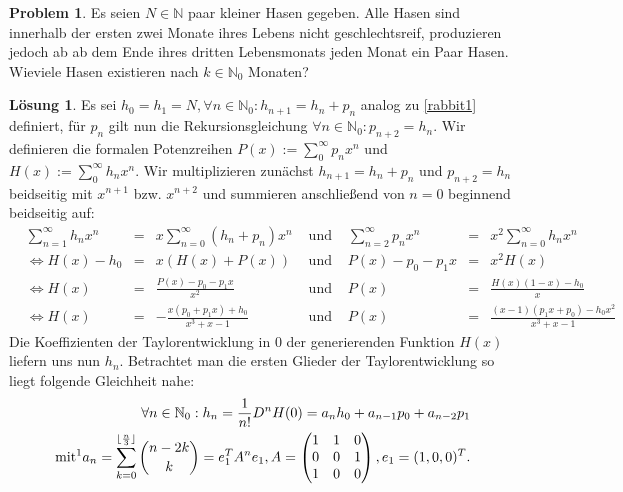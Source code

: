 \documentclass{article}
\theoremstyle{plain} %
\theoremstyle{definition} %
\newtheorem{problem}[theorem]{Problem}
\newtheorem{solution}[theorem]{Lösung}
\newcommand{\floor}[1]{\lfloor #1 \rfloor} %
\begin{document}
\begin{problem}
Es seien $N \in \mathbb{N}$ paar kleiner Hasen gegeben. Alle Hasen sind innerhalb der ersten zwei Monate ihres Lebens nicht geschlechtsreif, produzieren jedoch ab ab dem Ende ihres dritten Lebensmonats jeden Monat ein Paar Hasen. Wieviele Hasen existieren nach $k \in \mathbb{N}_0$ Monaten?
\end{problem}
\begin{solution}
  Es sei $h_0 = h_1 = N, \forall n \in \mathbb{N}_0 : h_{n+1} = h_n + p_n$ analog zu \ref{rabbit1} definiert, für $p_n$ gilt nun die Rekursionsgleichung $\forall n \in \mathbb{N}_0 : p_{n+2} = h_n$. Wir definieren die formalen Potenzreihen $P(x) := \sum_0^\infty p_n x^n$ und $H(x) := \sum_0^\infty h_n x^n$. Wir multiplizieren zunächst $h_{n+1} = h_n + p_n$ und $p_{n+2} = h_n$ beidseitig mit $x^{n+1}$ bzw. $x^{n+2}$ und summieren anschließend von $n=0$ beginnend beidseitig auf:
  \begin{align}
     & \sum_{n=1}^\infty h_n x^n & = & x \sum_{n=0}^\infty (h_n + p_n) x^n      & \text{ und } & \sum_{n=2}^\infty p_n x^n & = & x^2 \sum_{n=0}^\infty h_n x^n              \\
     & \iff H(x) - h_0           & = & x (H(x) + P(x))                          & \text{ und } & P(x) - p_0 - p_1x         & = & x^2 H(x)                                   \\
     & \iff H(x)                 & = & \frac{P(x) - p_0 - p_1x}{x^2}            & \text{ und } & P(x)                      & = & \frac{H(x)(1-x) - h_0}{x}                  \\
     & \iff H(x)                 & = & -\frac{x(p_0 + p_1x) + h_0}{x^3 + x - 1} & \text{ und } & P(x)                      & = & \frac{(x-1)(p_1x + p_0) - h_0x^2}{x^3+x-1}
  \end{align}
  Die Koeffizienten der Taylorentwicklung in $0$ der generierenden Funktion $H(x)$ liefern uns nun $h_n$. Betrachtet man die ersten Glieder der Taylorentwicklung so liegt folgende Gleichheit nahe:
  \begin{align}
    \forall n \in \mathbb{N}_0 : h_n = \frac{1}{n!}D^n H(0) = a_n h_0 + a_{n-1} p_0 + a_{n-2} p_1 \label{rabbitSolution1} \\ \text{ mit\footnotemark } a_n = \sum_{k=0}^{\floor{\frac{n}{3}}} \binom{n-2k}{k} = e_1^T A^n e_1, A = \left(\begin{matrix}
        1 & 1 & 0 \\ 0 & 0 & 1 \\ 1 & 0 & 0
      \end{matrix} \right), e_1 = (1, 0, 0)^T.

\end{align}
\end{solution}
\end{document}
